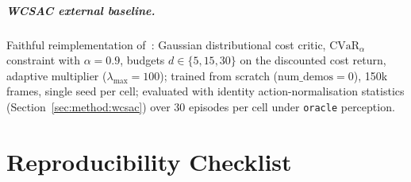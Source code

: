 \documentclass[11pt,a4paper]{report}
\newcommand{\cvar}{\ensuremath{\mathrm{CVaR}}}
\begin{document}
\paragraph{WCSAC external baseline.}
Faithful reimplementation of~\cite{yang2021wcsac}: Gaussian
distributional cost critic, $\cvar{}_{\alpha}$ constraint with
$\alpha = 0.9$, budgets $d \in \{5, 15, 30\}$ on the discounted cost
return, adaptive multiplier ($\lambda_{\max} = 100$); trained from
scratch ($\text{num\_demos} = 0$), 150k frames, single seed per
cell; evaluated with identity action-normalisation statistics
(Section~\ref{sec:method:wcsac}) over 30 episodes per cell under
\texttt{oracle} perception.

\chapter{Reproducibility Checklist}
\label{app:repro}
\end{document}
